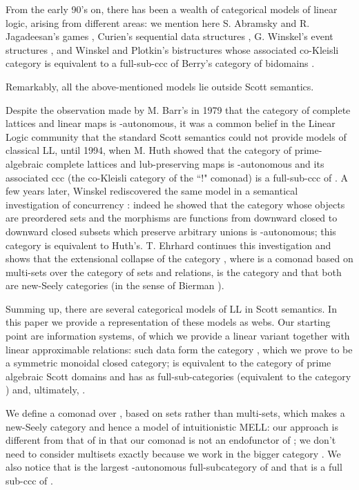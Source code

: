 \documentclass[copyright,creativecommons]{eptcs}
\begin{document}
From the early 90's on, there has been a wealth of categorical models of linear logic, arising from different areas: we mention here S. Abramsky and R. Jagadeesan's games \cite{Abramsky92}, Curien's sequential data structures \cite{Curien94}, G. Winskel's event structures \cite{Winskel88, Zhang92}, and Winskel and Plotkin's bistructures \cite{Winskel94} whose associated co-Kleisli category is equivalent to a full-sub-ccc of Berry's category of bidomains \cite{Berry79}.

Remarkably, all the above-mentioned models lie outside Scott semantics. 

Despite the observation made by M. Barr's in 1979 \cite{Barr79} that the category of complete lattices and linear maps is -autonomous, it was a common belief in the Linear Logic community that the standard Scott semantics could not provide models of classical LL, until 1994, when M. Huth showed \cite{Huth94} that the category  of prime-algebraic complete lattices and lub-preserving maps is -autonomous and its associated ccc  (the co-Kleisli category of the ``!" comonad) is a full-sub-ccc of . A few years later, Winskel rediscovered the same model in a semantical investigation of concurrency \cite{Winskel99,Winskel04}: indeed he showed that the category  whose objects are preordered sets and the morphisms are functions from  downward closed to downward closed subsets which preserve arbitrary unions is -autonomous; this category is equivalent to Huth's. T. Ehrhard \cite{Ehrhard09} continues this investigation and shows that the extensional collapse of the category , where  is a comonad based on multi-sets over the category  of sets and relations, is the category  and that both are new-Seely categories (in the sense of Bierman \cite{Bierman95}).

Summing up, there are several categorical models of LL in Scott semantics. In this paper we provide a representation of these models as webs. Our starting point are information systems, of which we provide a linear variant together with linear approximable relations: such data form the category , which we prove to be a symmetric monoidal closed category;  is equivalent to the category  of prime algebraic Scott domains and has as full-sub-categories  (equivalent to the category ) and, ultimately, .

We define a comonad  over , based on sets rather than multi-sets, which makes  a new-Seely category and hence a model of intuitionistic MELL: our approach is different from that of \cite{Ehrhard09} in that our comonad is not an endofunctor of ; we don't need to consider multisets exactly because we work in the bigger category . We also notice that  is the largest -autonomous full-subcategory of  and that  is a full sub-ccc of .
\end{document}

